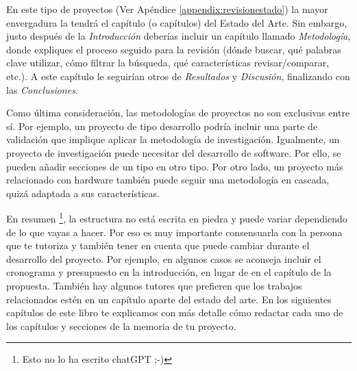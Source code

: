 En este tipo de proyectos (Ver Apéndice  \ref{appendix:revisionestado}) la mayor envergadura la tendrá el capítulo (o capítulos) del Estado del Arte. Sin embargo, justo después de la \textit{Introducción} deberías incluir un capítulo llamado \textit{Metodología}, donde expliques el proceso seguido para la revisión (dónde buscar, qué palabras clave utilizar, cómo filtrar la búsqueda, qué características revisar/comparar, etc.). A este capítulo le seguirían otros de \textit{Resultados} y \textit{Discusión}, finalizando con las \textit{Conclusiones}. 


 Como última consideración, las metodologías de proyectos no son exclusivas entre sí.  Por ejemplo, un proyecto de tipo desarrollo podría incluir una parte de validación que implique aplicar la metodología de investigación. Igualmente, un proyecto de investigación puede necesitar del desarrollo de software. Por ello, se pueden añadir secciones de un tipo en otro tipo. Por otro lado, un proyecto más relacionado con hardware también puede seguir una metodología en cascada, quizá adaptada a sus características.

En resumen \footnote{Esto no lo ha escrito chatGPT ;-)}, la estructura no está escrita en piedra y puede variar dependiendo de lo que vayas a hacer. Por eso es muy importante consensuarla con la persona que te tutoriza y también tener en cuenta que puede cambiar durante el desarrollo del proyecto. Por ejemplo, en algunos casos se aconseja incluir el cronograma y presupuesto en la introducción, en lugar de en el capítulo de la propuesta. También hay algunos tutores que prefieren que los trabajos relacionados estén en un capítulo aparte del estado del arte. En los siguientes capítulos de este libro te explicamos con más detalle cómo redactar cada uno de los capítulos y secciones de la memoria de tu proyecto.

